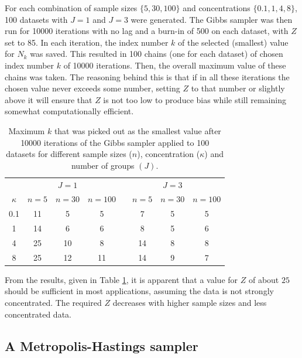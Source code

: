 \documentclass[]{gSCS2e}
\theoremstyle{plain}
\theoremstyle{definition}
\theoremstyle{remark}
\begin{document}
For each combination of sample sizes $\{5, 30, 100\}$ and concentrations $\{0.1, 1, 4, 8\}$, 100 datasets with $J=1$ and $J=3$ were generated. The Gibbs sampler was then run for 10000 iterations with no lag and a burn-in of 500 on each dataset, with $Z$ set to 85. In each iteration, the index number $k$ of the selected (smallest) value for $N_k$ was saved. This resulted in 100 chains (one for each dataset) of chosen index number $k$ of 10000 iterations. Then, the overall maximum value of these chains was taken. The reasoning behind this is that if in all these iterations the chosen value never exceeds some number, setting $Z$ to that number or slightly above it will ensure that $Z$ is not too low to produce bias while still remaining somewhat computationally efficient. 


\begin{table}[tb]
\centering
\caption{Maximum $k$ that was picked out as the smallest value after 10000 iterations of the Gibbs sampler applied to 100 datasets for different sample sizes ($n$), concentration ($\kappa$) and number of groups $(J)$.}
\label{tab:sufficientk}
\begin{tabular}{c@{\hskip 1.0cm}cccc@{\hskip 0.7cm}ccc}
  \toprule 
  & & $J=1$ & & & & $J=3$ & \\ 
   \cmidrule{2-4} \cmidrule{6-8}
  $\kappa$ & $n=5$ & $n=30$ & $n=100$ & & $n=5$ & $n=30$ & $n=100$ \\ 
  \hline 
 0.1 & 11 & 5 & 5 &  & 7 & 5 & 5 \\ 
  1 & 14 & 6 & 6 &  & 8 & 5 & 6 \\ 
  4 & 25 & 10 & 8 &  & 14 & 8 & 8 \\ 
  8 & 25 & 12 & 11 &  & 14 & 9 & 7 \\ 
   \bottomrule 
\end{tabular}
\end{table}

From the results, given in Table \ref{tab:sufficientk}, it is apparent that a value for $Z$ of about $25$ should be sufficient in most applications, assuming the data is not strongly concentrated. The required $Z$ decreases with higher sample sizes and less concentrated data.



\subsection{A Metropolis-Hastings sampler \label{vmmh}}
\end{document}
